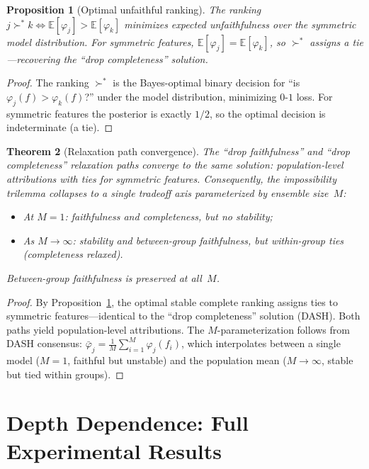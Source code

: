 \documentclass{article}
\newtheorem{theorem}{Theorem}
\newtheorem{proposition}[theorem]{Proposition}
\begin{document}
\begin{proposition}[Optimal unfaithful ranking]
\label{prop:optimal-unfaithful}
The ranking $j \succ^* k \Leftrightarrow \mathbb{E}[\varphi_j] > \mathbb{E}[\varphi_k]$
minimizes expected unfaithfulness over the symmetric model distribution.
For symmetric features, $\mathbb{E}[\varphi_j] = \mathbb{E}[\varphi_k]$,
so $\succ^*$ assigns a tie---recovering the ``drop completeness'' solution.
\end{proposition}

\begin{proof}
The ranking $\succ^*$ is the Bayes-optimal binary decision for
``is $\varphi_j(f) > \varphi_k(f)$?'' under the model distribution,
minimizing $0$-$1$ loss. For symmetric features the posterior is exactly
$1/2$, so the optimal decision is indeterminate (a tie).
\end{proof}

\begin{theorem}[Relaxation path convergence]
\label{thm:path-convergence}
The ``drop faithfulness'' and ``drop completeness'' relaxation paths
converge to the same solution: population-level attributions with ties
for symmetric features. Consequently, the impossibility trilemma
collapses to a single tradeoff axis parameterized by ensemble size~$M$:
\begin{itemize}
    \item At $M = 1$: faithfulness and completeness, but no stability;
    \item As $M \to \infty$: stability and between-group faithfulness,
          but within-group ties (completeness relaxed).
\end{itemize}
Between-group faithfulness is preserved at all~$M$.
\end{theorem}

\begin{proof}
By Proposition~\ref{prop:optimal-unfaithful}, the optimal stable
complete ranking assigns ties to symmetric features---identical to the
``drop completeness'' solution (DASH). Both paths yield population-level
attributions. The $M$-parameterization follows from DASH consensus:
$\bar\varphi_j = \frac{1}{M}\sum_{i=1}^M \varphi_j(f_i)$, which
interpolates between a single model ($M=1$, faithful but unstable)
and the population mean ($M \to \infty$, stable but tied within groups).
\end{proof}

\section{Depth Dependence: Full Experimental Results}
\end{document}

